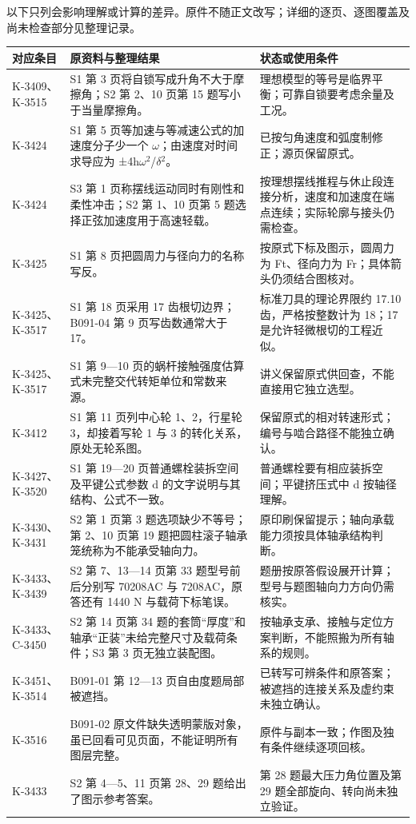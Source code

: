 \documentclass[zihao=5,a4paper,UTF8,fontset=fandol]{ctexart}
\begin{document}
以下只列会影响理解或计算的差异。原件不随正文改写；详细的逐页、逐图覆盖及尚未检查部分见整理记录。


\begin{longtable}{p{4.86cm}p{4.86cm}p{4.86cm}}
\toprule
对应条目 & 原资料与整理结果 & 状态或使用条件 \\

\midrule
\endhead
K-3409、K-3515 & S1 第 3 页将自锁写成升角不大于摩擦角；S2 第 2、10 页第 15 题写小于当量摩擦角。 & 理想模型的等号是临界平衡；可靠自锁要考虑余量及工况。 \\
K-3424 & S1 第 5 页等加速与等减速公式的加速度分子少一个 $\omega$；由速度对时间求导应为 ±4h$\omega$$^{2}$/$\delta$$^{2}$。 & 已按匀角速度和弧度制修正；源页保留原式。 \\
K-3424 & S3 第 1 页称摆线运动同时有刚性和柔性冲击；S2 第 1、10 页第 5 题选择正弦加速度用于高速轻载。 & 按理想摆线推程与休止段连接分析，速度和加速度在端点连续；实际轮廓与接头仍需检查。 \\
K-3425 & S1 第 8 页把圆周力与径向力的名称写反。 & 按原式下标及图示，圆周力为 Ft、径向力为 Fr；具体箭头仍须结合图核对。 \\
K-3425、K-3517 & S1 第 18 页采用 17 齿根切边界；B091-04 第 9 页写齿数通常大于 17。 & 标准刀具的理论界限约 17.10 齿，严格按整数计为 18；17 是允许轻微根切的工程近似。 \\
K-3425、K-3517 & S1 第 9—10 页的蜗杆接触强度估算式未完整交代转矩单位和常数来源。 & 讲义保留原式供回查，不能直接用它独立选型。 \\
K-3412 & S1 第 11 页列中心轮 1、2，行星轮 3，却接着写轮 1 与 3 的转化关系，原处无轮系图。 & 保留原式的相对转速形式；编号与啮合路径不能独立确认。 \\
K-3427、K-3520 & S1 第 19—20 页普通螺栓装拆空间及平键公式参数 d 的文字说明与其结构、公式不一致。 & 普通螺栓要有相应装拆空间；平键挤压式中 d 按轴径理解。 \\
K-3430、K-3431 & S2 第 1 页第 3 题选项缺少不等号；第 2、10 页第 19 题把圆柱滚子轴承笼统称为不能承受轴向力。 & 原印刷保留提示；轴向承载能力须按具体轴承结构判断。 \\
K-3433、K-3439 & S2 第 7、13—14 页第 33 题型号前后分别写 70208AC 与 7208AC，原答还有 1440 N 与载荷下标笔误。 & 题册按原答假设展开计算；型号与题图轴向力方向仍需核实。 \\
K-3433、C-3450 & S2 第 14 页第 34 题的套筒“厚度”和轴承“正装”未给完整尺寸及载荷条件；S3 第 3 页无独立装配图。 & 按轴承支承、接触与定位方案判断，不能照搬为所有轴系的规则。 \\
K-3451、K-3514 & B091-01 第 12—13 页自由度题局部被遮挡。 & 已转写可辨条件和原答案；被遮挡的连接关系及虚约束未独立确认。 \\
K-3516 & B091-02 原文件缺失透明蒙版对象，虽已回看可见页面，不能证明所有图层完整。 & 原件与副本一致；作图及独有条件继续逐项回核。 \\
K-3433 & S2 第 4—5、11 页第 28、29 题给出了图示参考答案。 & 第 28 题最大压力角位置及第 29 题全部旋向、转向尚未独立验证。 \\
\bottomrule
\end{longtable}
\end{document}
